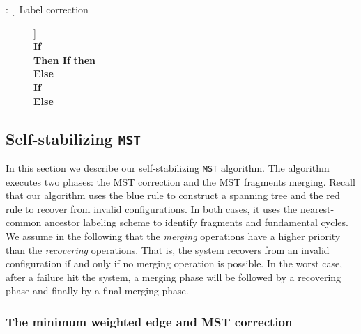 \documentclass[11pt,a4paper]{article}
\newcommand{\MST}{\mbox{\tt MST}}
\begin{document}
\begin{description}
\item[: [\ Label correction]]\\
\textbf{If}  \textcolor[gray]{0.5}{}\\
\textbf{Then If}  \textbf{then} \\
\hspace*{1cm} \textbf{Else } \\
\hspace*{1cm} \textbf{If} \\
\hspace*{1,1cm}\textbf{Else} 
\end{description}

\subsection{Self-stabilizing \MST}

In this section we describe our self-stabilizing \MST\/
algorithm. The algorithm executes two phases: the MST correction and
the MST fragments merging. Recall that our algorithm uses the blue rule to
construct a spanning tree and the red rule to recover from invalid configurations. 
In both cases, it uses the nearest-common ancestor labeling scheme to
identify fragments and fundamental cycles.
We assume in the following that the \textit{merging} operations have a higher priority
than the \textit{recovering} operations. That is, the system recovers
from an invalid configuration if and only if no merging operation is 
possible. In the worst case, after a failure hit the system, a
merging phase will be followed by a recovering phase and finally by a
final merging phase.

\subsubsection{The minimum weighted edge and MST correction}
\end{document}
